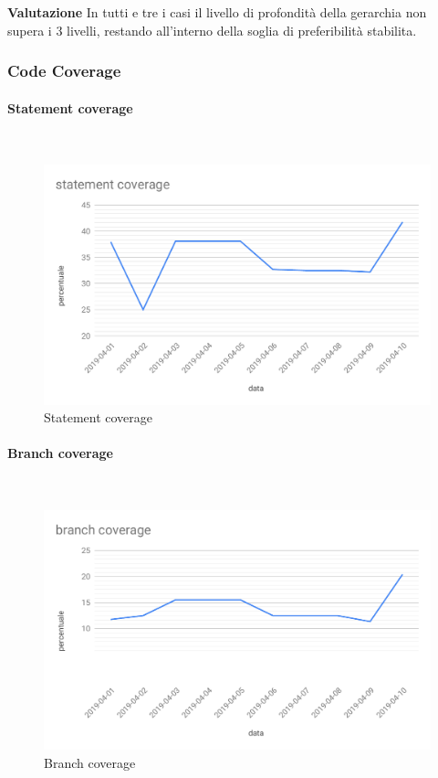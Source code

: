 \textbf{Valutazione}
In tutti e tre i casi il livello di profondità della gerarchia non supera i 3 livelli, restando all'interno della soglia di preferibilità stabilita. 




\subsubsection{Code Coverage}
\paragraph{Statement coverage}\mbox{}\\
\begin{figure}[H]
	\centering
	\includegraphics[scale=0.6]{res/images/RA/statement-coverage-RQ.pdf}
	\caption{Statement coverage}
\end{figure}	
\paragraph{Branch coverage}\mbox{}\\
\begin{figure}[H]
	\centering
	\includegraphics[scale=0.6]{res/images/RA/branch-coverage-RQ.pdf}
	\caption{Branch coverage}
\end{figure}

